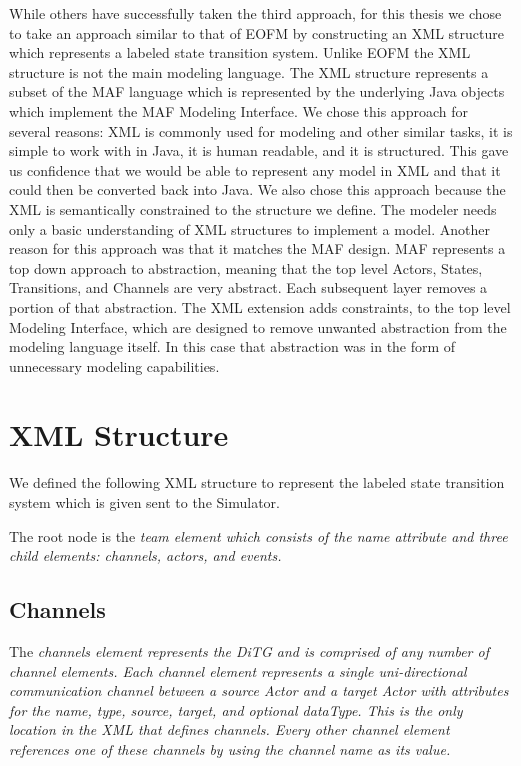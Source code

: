 While others have successfully taken the third approach, for this thesis we chose to take an approach similar to that of EOFM by constructing an XML structure which represents a labeled state transition system.  Unlike EOFM the XML structure is not the main modeling language.  The XML structure represents a subset of the MAF language which is represented by the underlying Java objects which implement the MAF Modeling Interface.  We chose this approach for several reasons:  XML is commonly used for modeling and other similar tasks, it is simple to work with in Java, it is human readable, and it is structured.  This gave us confidence that we would be able to represent any model in XML and that it could then be converted back into Java.  We also chose this approach because the XML is semantically constrained to the structure we define.  The modeler needs only a basic understanding of XML structures to implement a model.  Another reason for this approach was that it matches the MAF design.  MAF represents a top down approach to abstraction, meaning that the top level Actors, States, Transitions, and Channels are very abstract.  Each subsequent layer removes a portion of that abstraction.  The XML extension adds constraints, to the top level Modeling Interface, which are designed to remove unwanted abstraction from the modeling language itself.  In this case that abstraction was in the form of unnecessary modeling capabilities.

\section{XML Structure}

We defined the following XML structure to represent the labeled state transition system which is given sent to the Simulator.  

The root node is the \em{team} element which consists of the \em{name} attribute and three child elements: \em{channels}, \em{actors}, and \em{events}.

\begin{spacing}{.5}

\end{spacing}

\subsection{Channels}

The \em{channels} element represents the DiTG and is comprised of any number of \em{channel} elements.  Each \em{channel} element represents a single uni-directional communication channel between a source Actor and a target Actor with attributes for the name, type, source, target, and optional dataType.  This is the only location in the XML that defines channels.  Every other \em{channel} element references one of these channels by using the channel name as its value.


